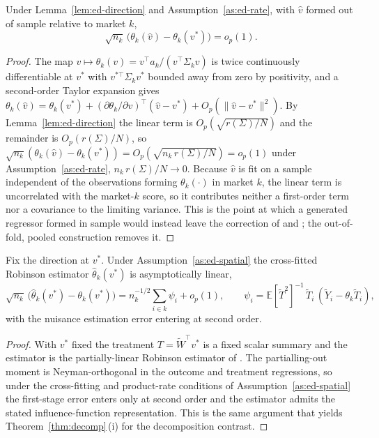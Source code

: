 \begin{lemma}\label{lem:ed-second-order}
Under Lemma~\ref{lem:ed-direction} and Assumption~\ref{as:ed-rate}, with $\hat v$
formed out of sample relative to market $k$,
\[
\sqrt{n_k}\,\bigl(\theta_k(\hat v)-\theta_k(v^\ast)\bigr)=o_p(1).
\]
\end{lemma}

\begin{proof}
The map $v\mapsto\theta_k(v)=v^\top a_k/(v^\top\Sigma_k v)$ is twice continuously
differentiable at $v^\ast$ with $v^{\ast\top}\Sigma_k v^\ast$ bounded away from zero by
positivity, and a second-order Taylor expansion gives $\theta_k(\hat
v)=\theta_k(v^\ast)+(\partial\theta_k/\partial v)^\top(\hat v-v^\ast)+O_p(\lVert\hat
v-v^\ast\rVert^2)$. By Lemma~\ref{lem:ed-direction} the linear term is
$O_p(\sqrt{r(\Sigma)/N})$ and the remainder is $O_p(r(\Sigma)/N)$, so
$\sqrt{n_k}(\theta_k(\hat v)-\theta_k(v^\ast))=O_p(\sqrt{n_k\,r(\Sigma)/N})=o_p(1)$
under Assumption~\ref{as:ed-rate}, $n_k\,r(\Sigma)/N\to0$. Because $\hat v$ is fit on a
sample independent of the observations forming $\theta_k(\cdot)$ in market $k$, the
linear term is uncorrelated with the market-$k$ score, so it contributes neither a
first-order term nor a covariance to the limiting variance. This is the point at which
a generated regressor formed in sample would instead leave the correction of
\citet{pagan1984econometric} and \citet{hahn2013asymptotic}; the out-of-fold, pooled
construction removes it.
\end{proof}

\begin{lemma}\label{lem:ed-linearity}
Fix the direction at $v^\ast$. Under Assumption~\ref{as:ed-spatial} the cross-fitted
Robinson estimator $\hat\theta_k(v^\ast)$ is asymptotically linear,
\[
\sqrt{n_k}\,\bigl(\hat\theta_k(v^\ast)-\theta_k(v^\ast)\bigr)
=n_k^{-1/2}\sum_{i\in k}\psi_i+o_p(1),
\qquad
\psi_i=\mathbb{E}[\tilde T^2]^{-1}\,\tilde T_i\,(\tilde Y_i-\theta_k\tilde T_i),
\]
with the nuisance estimation error entering at second order.
\end{lemma}

\begin{proof}
With $v^\ast$ fixed the treatment $T=\tilde W^\top v^\ast$ is a fixed scalar summary and
the estimator is the partially-linear Robinson estimator of
\citet[Theorems~3.1--3.2]{chernozhukov2018double}. The partialling-out moment is
Neyman-orthogonal in the outcome and treatment regressions, so under the cross-fitting
and product-rate conditions of Assumption~\ref{as:ed-spatial} the first-stage error
enters only at second order and the estimator admits the stated influence-function
representation. This is the same argument that yields
Theorem~\ref{thm:decomp}\,(i) for the decomposition contrast.
\end{proof}

